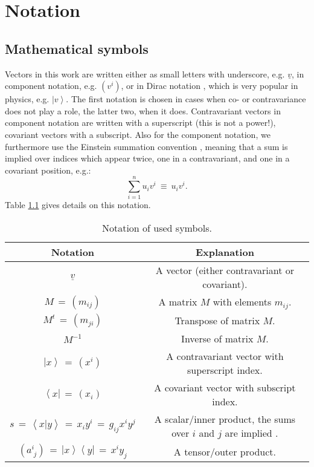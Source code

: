 %
%

\chapter{Notation}
\label{ch:notation}

\section{Mathematical symbols}
Vectors in this work are written either as small letters with underscore, e.g. $\underline{v}$, 
in component notation, e.g. $\left( v^i \right)$, or in Dirac notation \cite{wiki_braket}, which is 
very popular in physics, e.g. $\left| v \right>$. 
The first notation is chosen in cases when co- or contravariance does not play a role, 
the latter two, when it does. 
Contravariant vectors in component notation are written with a superscript (this is not a power!), 
covariant vectors with a subscript.
Also for the component notation, we furthermore use the Einstein summation convention \cite{wiki_summation},
meaning that a sum is implied over indices which appear twice, one in a contravariant, and one
in a covariant position, e.g.:
\begin{equation}
	\sum_{i=1}^{n} u_i v^i \ \equiv \ u_i v^i.
\end{equation}
Table \ref{tab:notation} gives details on this notation.

\begin{table}[htb]
	\centering
	\begin{tabular}{|c|c|}
		\hline
		\bf{Notation} & \bf{Explanation} \tabularnewline
		\hline
		$ \underline{v} $ & A vector (either contravariant or covariant). \tabularnewline
		\hline
		$ M \,=\, \left( m_{ij} \right) $ & A matrix $M$ with elements $m_{ij}$. \tabularnewline
		\hline
		$ M^t \,=\, \left( m_{ji} \right) $ & Transpose of matrix $M$. \tabularnewline
		\hline
		$ M^{-1} $ & Inverse of matrix $M$. \tabularnewline
		\hline
		$\left| x \right> \,=\, \left( x^i \right) $ & A contravariant vector with superscript index. \tabularnewline
		\hline
		$\left< x \right| \,=\, \left( x_i \right) $ & A covariant vector with subscript index. \tabularnewline
		\hline
		$s \,=\, \left< x | y \right> \,=\, x_i y^i \,=\, g_{ij} x^i y^j $ & A scalar/inner product, the sums over $i$ and $j$ are implied \cite{wiki_summation}. \tabularnewline
		\hline
		$\left(a^{i}_{\;j}\right) \,=\, \left| x \right> \left< y \right| \,=\, x^i y_j$ & A tensor/outer product. \tabularnewline
		\hline
	\end{tabular}
	\caption[Symbol notation]{Notation of used symbols.}
	\label{tab:notation}
\end{table}


